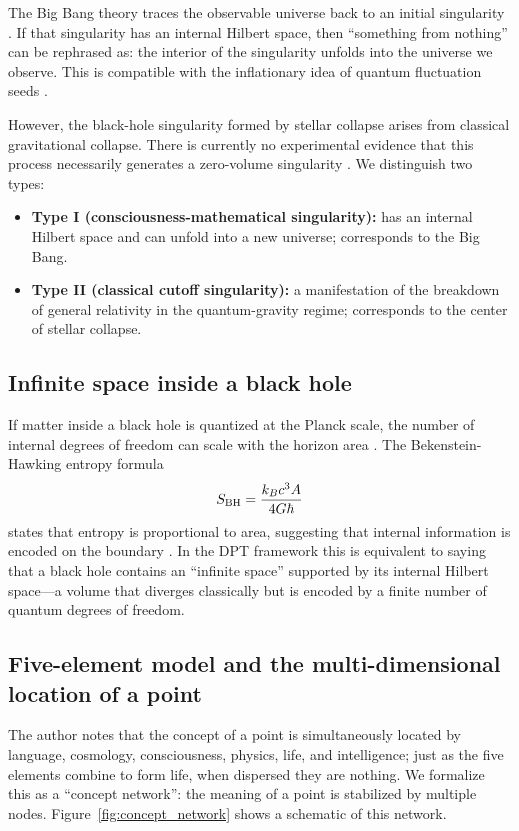 \documentclass[11pt,a4paper]{article}
\theoremstyle{definition}
\begin{document}
The Big Bang theory traces the observable universe back to an initial singularity \cite{guth1981}. If that singularity has an internal Hilbert space, then ``something from nothing'' can be rephrased as: the interior of the singularity unfolds into the universe we observe. This is compatible with the inflationary idea of quantum fluctuation seeds \cite{starobinsky1979}.

However, the black-hole singularity formed by stellar collapse arises from classical gravitational collapse. There is currently no experimental evidence that this process necessarily generates a zero-volume singularity \cite{cardoso2016}. We distinguish two types:
\begin{itemize}
\item \textbf{Type I (consciousness-mathematical singularity):} has an internal Hilbert space and can unfold into a new universe; corresponds to the Big Bang.
\item \textbf{Type II (classical cutoff singularity):} a manifestation of the breakdown of general relativity in the quantum-gravity regime; corresponds to the center of stellar collapse.
\end{itemize}

\subsection{Infinite space inside a black hole}

If matter inside a black hole is quantized at the Planck scale, the number of internal degrees of freedom can scale with the horizon area \cite{bekenstein1973}. The Bekenstein-Hawking entropy formula
\begin{equation}
S_{\rm BH} = \frac{k_B c^3 A}{4 G \hbar}
\end{equation}
states that entropy is proportional to area, suggesting that internal information is encoded on the boundary \cite{hawking1975}. In the DPT framework this is equivalent to saying that a black hole contains an ``infinite space'' supported by its internal Hilbert space---a volume that diverges classically but is encoded by a finite number of quantum degrees of freedom.

\subsection{Five-element model and the multi-dimensional location of a point}

The author notes that the concept of a point is simultaneously located by language, cosmology, consciousness, physics, life, and intelligence; just as the five elements combine to form life, when dispersed they are nothing. We formalize this as a ``concept network'': the meaning of a point is stabilized by multiple nodes. Figure~\ref{fig:concept_network} shows a schematic of this network.
\end{document}
